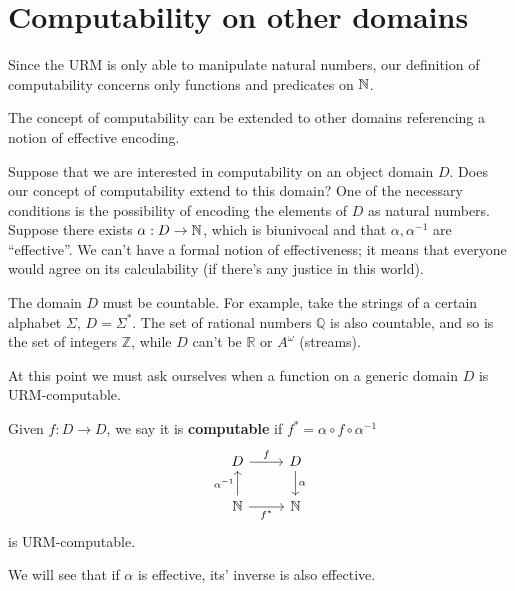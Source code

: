\chapter{Computability on other domains}
Since the URM is only able to manipulate natural numbers, our definition of computability concerns only functions and predicates on $\mathbb{N}$.

The concept of computability can be extended to other domains referencing a notion of effective encoding.

Suppose that we are interested in computability on an object domain $D$. 
Does our concept of computability extend to this domain? 
One of the necessary conditions is the possibility of encoding the elements of $D$ as natural numbers. 
Suppose there exists $ \alpha: D \rightarrow \mathbb{N} $, which is biunivocal and that $ \alpha, \alpha^{-1} $ are ``effective''. 
We can't have a formal notion of effectiveness; it means that everyone would agree on its calculability (if there's any justice in this world).

The domain $D$ must be countable. For example, take the strings of a certain alphabet $ \Sigma $, $ D = \Sigma^* $. 
The set of rational numbers $ \mathbb{Q} $ is also countable, and so is the set of integers $\mathbb{Z}$, while $D$ can't be  $ \mathbb{R} $ or $A^\omega$ (streams).

At this point we must ask ourselves when a function on a generic domain $D$ is URM-computable. 

\begin{definition}
  Given $ f: D \rightarrow D $, we say it is \textbf{computable} if $ f^* = \alpha \circ f \circ \alpha^{-1}$
  \[\begin{tikzcd}
    D & D \\
    \nat & \nat
    \arrow["{\alpha^{-1}}", from=2-1, to=1-1]
    \arrow["f", from=1-1, to=1-2]
    \arrow["\alpha", from=1-2, to=2-2]
    \arrow["{f^*}"', from=2-1, to=2-2]
  \end{tikzcd}\]
  is URM-computable.
\end{definition}

We will see that if $\alpha$ is effective, its' inverse is also effective.

